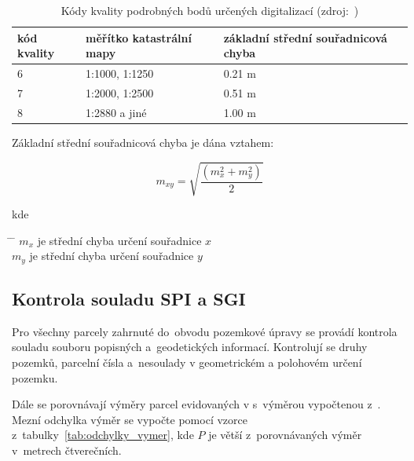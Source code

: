 \begin{table}[H]
    \begin{tabular}{|l|l|l|}
        \hline
         kód kvality & měřítko katastrální mapy & základní střední souřadnicová chyba \\
        \hline
        \hline
         6 & 1:1000, 1:1250 & 0.21 m \\ \hline
         7 & 1:2000, 1:2500 & 0.51 m \\ \hline
         8 & 1:2880 a jiné & 1.00 m \\
         \hline
    \end{tabular}
    \centering
    \caption[Kódy kvality podrobných bodů určených digitalizací]{Kódy kvality podrobných bodů určených digitalizací (zdroj:~\citep{vyhlaska_357})}
    \label{tab:kody_kvality_digit}
\end{table}

Základní střední souřadnicová chyba je dána vztahem:

\begin{equation}
	m_{xy} = \sqrt{\frac{(m_{x}^{2}+{m_{y}^{2}})}{2}}
\end{equation}

kde
\begin{tabbing}
\hspace{2em} \= \hspace{5em} \= \kill
	\> $m_{x}$	\> je střední chyba určení souřadnice $x$ \\
	\> $m_{y}$	\> je střední chyba určení souřadnice $y$
\end{tabbing}

\subsection{Kontrola souladu SPI a SGI}
\label{soulad_spi_sgi}

Pro všechny parcely zahrnuté do~obvodu pozemkové úpravy se provádí kontrola souladu souboru popisných a~geodetických informací. Kontrolují se druhy pozemků, parcelní čísla a~nesoulady v geometrickém a polohovém určení pozemku. 

Dále se porovnávají výměry parcel evidovaných v  s~výměrou vypočtenou z~. Mezní odchylka výměr se vypočte pomocí vzorce z~tabulky~\ref{tab:odchylky_vymer}, kde $P$ je větší z~porovnávaných výměr v~metrech čtverečních.

